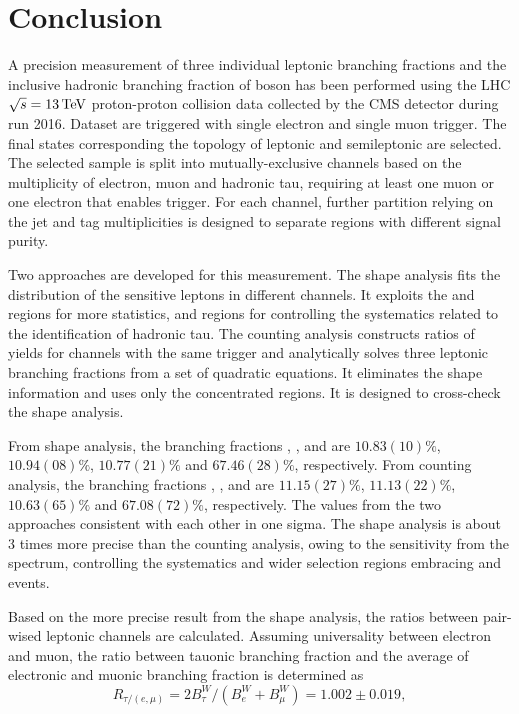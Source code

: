 \chapter{Conclusion}
\label{sec:conclusion}


A precision measurement of three individual leptonic branching fractions and the inclusive hadronic branching fraction of \PW boson has been performed using the LHC $\sqrt{s}=13\,\text{Te\hspace{-.08em}V}$ proton-proton collision data collected by the CMS detector during run 2016. Dataset are triggered with single electron and single muon trigger. The final states corresponding the topology of leptonic and semileptonic \ttbar are selected. The selected sample is split into mutually-exclusive channels based on the multiplicity of electron, muon and hadronic tau, requiring at least one muon or one electron that enables trigger. For each channel, further partition relying on the jet and \PQb tag multiplicities is designed to separate regions with different signal purity.

Two approaches are developed for this measurement. The shape analysis fits the \pt distribution of the sensitive leptons in different channels. It exploits the \WW and \wjets regions for more \PW statistics, and \zjets regions for controlling the systematics related to the identification of hadronic tau. The counting analysis constructs ratios of yields for channels with the same trigger and analytically solves three leptonic branching fractions from a set of quadratic equations. It eliminates the shape information and uses only the \ttbar concentrated regions. It is designed to cross-check the shape analysis. 


From shape analysis, the \PW branching fractions \BWe, \BWm, \BWt and \BWh are $10.83(10)\%$, $10.94(08)\%$, $10.77(21)\%$ and $67.46(28)\%$, respectively. From counting analysis, the \PW branching fractions \BWe, \BWm, \BWt and \BWh are $11.15(27)\%$, $11.13(22)\%$, $10.63(65)\%$ and $67.08(72)\%$, respectively. The values from the two approaches consistent with each other in one sigma. The shape analysis is about 3 times more precise than the counting analysis, owing to the sensitivity from the \pt spectrum, controlling the \PGth systematics and wider selection regions embracing \WW and \wjets events. 

Based on the more precise result from the shape analysis, the ratios between pair-wised leptonic channels are calculated. Assuming universality between electron and muon, the ratio between tauonic branching fraction and the average of electronic and muonic branching fraction is determined as
\begin{equation*}
    R_{\tau/(e,\mu)} = 2 B^W_\tau /(B^W_e +  B^W_\mu) = 1.002\pm0.019,
\end{equation*}

